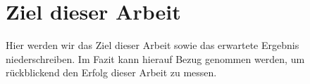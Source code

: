 \section{Ziel dieser Arbeit}\label{s:Ziel} %

Hier werden wir das Ziel dieser Arbeit sowie das erwartete Ergebnis niederschreiben.
Im Fazit kann hierauf Bezug genommen werden, um rückblickend den Erfolg dieser Arbeit zu messen.
